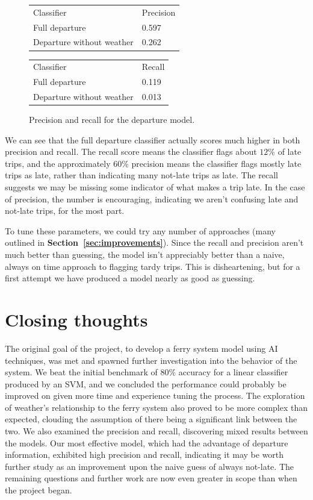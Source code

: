 \documentclass[11pt]{article} %
\begin{document}
\begin{figure}
    \begin{tabular}{ll}
         Classifier & Precision\\
         Full departure & 0.597\\
         Departure without weather & 0.262\\
    \end{tabular}
    
    \begin{tabular}{ll}
         Classifier & Recall\\
         Full departure & 0.119\\
         Departure without weather & 0.013\\
    \end{tabular}
    \caption{Precision and recall for the departure model.}
    \label{fig:pr_departures}
\end{figure}

We can see that the full departure classifier actually scores much higher in
both precision and recall. The recall score means the classifier flags about 
$12\%$ of late trips, and the approximately $60\%$ precision means the classifier
flags mostly late trips as late, rather than indicating many not-late trips
as late. The recall suggests we may be missing some indicator of what makes a 
trip late. In the case of precision, the number is encouraging, indicating we 
aren't confusing late and not-late trips, for the most part.

To tune these parameters, we could try any number of approaches (many outlined in
\textbf{Section~\ref{sec:improvements}}). Since the recall and precision aren't 
much better than guessing, the model isn't appreciably better than a naive, always 
on time approach to flagging tardy trips. This is disheartening, but for a first 
attempt we have produced a model nearly as good as guessing.


\section{Closing thoughts}
\label{sec:summary}
The original goal of the project, to develop a ferry system model using AI 
techniques, was met and spawned further investigation into the behavior of the
system. We beat the initial benchmark of $80\%$ accuracy for a linear classifier 
produced by an SVM, and we concluded the performance could probably be improved
on given more time and experience tuning the process. The exploration of weather's
relationship to the ferry system also proved to be more complex than expected, 
clouding the assumption of there being a significant link between the two. We 
also examined the precision and recall, discovering mixed results between the 
models. Our most effective model, which had the advantage of departure information,
exhibited high precision and recall, indicating it may be worth further study
as an improvement upon the naive guess of always not-late. The remaining 
questions and further work are now even greater in scope than when the 
project began.
\end{document}
